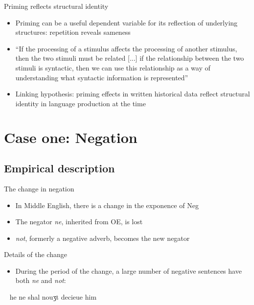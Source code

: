 \documentclass{digs-slides}
\newcommand{\includegraph}[2][]{\mode<beamer>{\texttt{[image: \#2]}}
    \mode<handout>{\texttt{[image: \#2]}}}
\begin{document}
\begin{frame}{Priming reflects structural identity}
	\begin{itemize}
		\item Priming can be a useful dependent variable for its reflection of underlying structures: repetition reveals sameness
		\item “If the processing of a stimulus affects the processing of another stimulus, then the two stimuli must be related [...] if the relationship between the two stimuli is syntactic, then we can use this relationship as a way of understanding what syntactic information is represented” \parencite[490]{Branigan:1995}
		\item Linking hypothesis: priming effects in written
                  historical data reflect structural identity in
                  language production at the time
	\end{itemize}
\end{frame}

\section{Case one: Negation}

\subsection{Empirical description}
\label{sec:empirical-aspects}

\begin{frame}{The change in negation}
    \begin{itemize}
      \item In Middle English, there is a change in the exponence of Neg
      \item The negator \emph{ne}, inherited from OE, is lost
      \item \emph{not}, formerly a negative adverb, becomes the new negator
    \end{itemize}
\end{frame}

\begin{frame}{Details of the change}
    \begin{itemize}
      \item During the period of the change, a large number of negative
        sentences have both \emph{ne} and \emph{not}:
    \end{itemize}
    \ex~
    he ne shal nouʒt decieue him 
    \xe
    \begin{center}
        \includegraph{figures/three-lines2}
    \end{center}
\end{frame}
\end{document}
